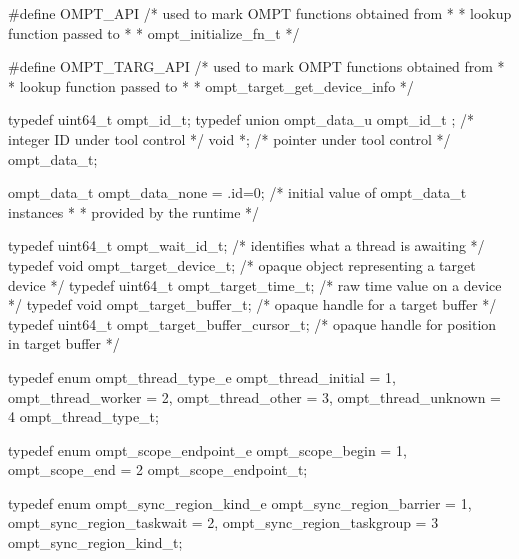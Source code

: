 \documentclass{article}
\begin{document}
\begin{boxedcode}
#define OMPT\_API                              /* used to mark OMPT functions obtained from   *
                                               * lookup function passed to                   *
                                               * ompt\_initialize\_fn\_t                        */
                                             
#define OMPT\_TARG\_API                         /* used to mark OMPT functions obtained from   *
                                               * lookup function passed to                   *
                                               * ompt\_target\_get\_device\_info                 */
                                             
typedef uint64\_t ompt\_id\_t;
typedef union ompt\_data\_u {
  ompt\_id\_t ;                               /* integer ID under tool control               */
  void *;                                  /* pointer under tool control                  */
} ompt\_data\_t;

ompt\_data\_t ompt\_data\_none = {.id=0};         /* initial value of ompt\_data\_t instances      *
                                               * provided by the runtime                     */

typedef uint64\_t ompt\_wait\_id\_t;              /* identifies what a thread is awaiting        */
typedef void ompt\_target\_device\_t;            /* opaque object representing a target device  */
typedef uint64\_t ompt\_target\_time\_t;          /* raw time value on a device                  */
typedef void ompt\_target\_buffer\_t;            /* opaque handle for a target buffer           */ 
typedef uint64\_t ompt\_target\_buffer\_cursor\_t; /* opaque handle for position in target buffer */

typedef enum ompt\_thread\_type\_e {
  ompt\_thread\_initial                 = 1,
  ompt\_thread\_worker                  = 2,
  ompt\_thread\_other                   = 3,
  ompt\_thread\_unknown                 = 4
} ompt\_thread\_type\_t;

typedef enum ompt\_scope\_endpoint\_e {
  ompt\_scope\_begin                    = 1,
  ompt\_scope\_end                      = 2
} ompt\_scope\_endpoint\_t;

typedef enum ompt\_sync\_region\_kind\_e {
  ompt\_sync\_region\_barrier            = 1, 
  ompt\_sync\_region\_taskwait           = 2,
  ompt\_sync\_region\_taskgroup          = 3
} ompt\_sync\_region\_kind\_t;


\end{boxedcode}
\end{document}
